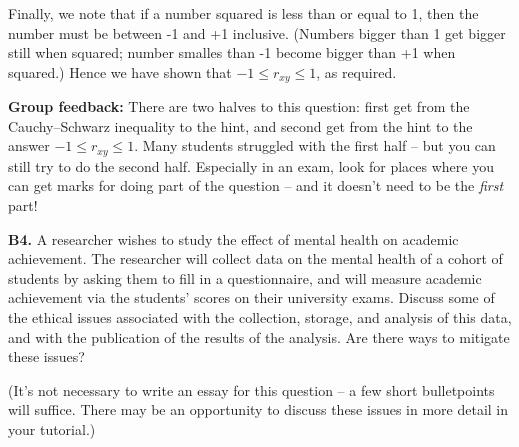 \documentclass[
  a4paper,
]{book}
\theoremstyle{definition}
\theoremstyle{definition}
\theoremstyle{definition}
\theoremstyle{definition}
\theoremstyle{remark}
\begin{document}
\begin{myanswers}
Finally, we note that if a number squared is less than or equal to 1, then the number must be between -1 and +1 inclusive. (Numbers bigger than 1 get bigger still when squared; number smalles than -1 become bigger than +1 when squared.) Hence we have shown that \(-1 \leq r_{xy} \leq 1\), as required.

\textbf{Group feedback:} There are two halves to this question: first get from the Cauchy--Schwarz inequality to the hint, and second get from the hint to the answer \(-1 \leq r_{xy} \leq 1\). Many students struggled with the first half -- but you can still try to do the second half. Especially in an exam, look for places where you can get marks for doing part of the question -- and it doesn't need to be the \emph{first} part!

\end{myanswers}

\textbf{B4.} A researcher wishes to study the effect of mental health on academic achievement. The researcher will collect data on the mental health of a cohort of students by asking them to fill in a questionnaire, and will measure academic achievement via the students' scores on their university exams. Discuss some of the ethical issues associated with the collection, storage, and analysis of this data, and with the publication of the results of the analysis. Are there ways to mitigate these issues?

(It's not necessary to write an essay for this question -- a few short bulletpoints will suffice. There may be an opportunity to discuss these issues in more detail in your tutorial.)
\end{document}
